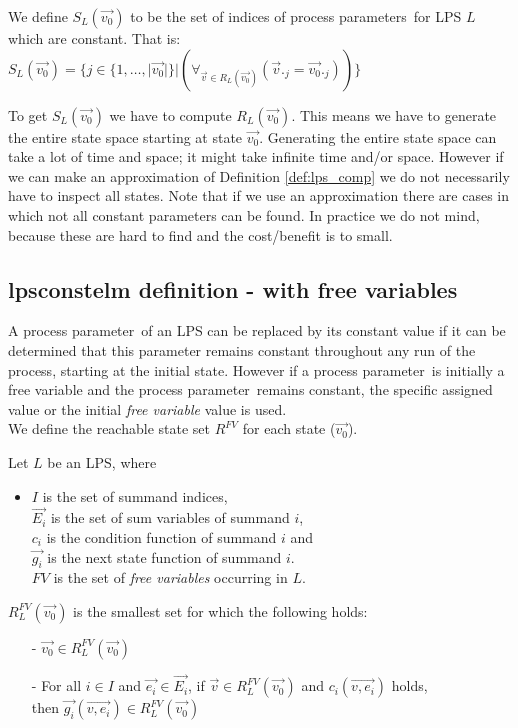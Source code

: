 \index{}\documentclass[a4paper,10pt]{article}
\theoremstyle{plain}
\theoremstyle{definition}
\newcommand{\ovr}{\overrightarrow}
\newcommand{\pp}{process parameter}
\newcommand{\pps}{process parameters}
\newcommand{\ti}{\textit}
\begin{document}
\begin{defn}\label{def:lps_comp} We define $S_L(\ovr{v_0})$ to be the set of indices of \pps\ for LPS $L$ which are constant. That is:\\

$S_L(\ovr{v_0}) = \lbrace j \in  \lbrace 1, \ldots, \vert \ovr{v_0}\vert  \rbrace \vert (\forall_{\ovr{v} \in R_L(\ovr{v_0})}( \ovr{v}._j = \ovr{v_{0}}._j)) \rbrace $
\end{defn}

To get $S_L(\ovr{v_0})$ we have to compute $R_L(\ovr{v_0})$. This means we have to generate the entire state space starting at state $\ovr{v_0}$. Generating the entire state space can take a lot of time and space; it might take infinite time and/or space. However if we can make an approximation of Definition \ref{def:lps_comp} we do not necessarily have to inspect all states. Note that if we use an approximation there are cases in which not all constant parameters can be found. In practice we do not mind, because these are hard to find and the cost/benefit is to small.

\subsection{lpsconstelm definition - with free variables}

A \pp\ of an LPS can be replaced by its constant value if it can be determined that this parameter remains constant throughout any run of the process, starting at the initial state. However if a \pp\ is initially a free variable and the \pp\ remains constant, the specific assigned value or the initial \ti{free variable} value is used.\\

We define the reachable state set $R^{FV}$ for each state ($\ovr{v_0}$). 
\begin{defn} Let $L$ be an LPS, where\begin{itemize}
\item $I$ is the set of summand indices, \\ $\ovr{E_i}$ is the set of sum variables of summand $i$, \\ $c_i$ is the condition function of summand $i$ and \\ $\ovr{g_i}$ is the next state function of summand $i$. \\
$FV$ is the set of \ti{free variables} occurring in $L$.\\
\end{itemize}

$R_L^{FV}(\ovr{v_0})$ is the smallest set for which the following holds:
  \begin{itemize}
    \item[-] $\ovr{v_0} \in R_L^{FV}(\ovr{v_0})$
    \item[-] For all $i \in I$ and $\ovr{e_i} \in \ovr{E_i}$, if $\ovr{v} \in R_L^{FV}(\ovr{v_0})$ and $c_i(\ovr{v, e_i})$ holds, \\ then $\ovr{g_i}(\ovr{v, e_i}) \in R_L^{FV}(\ovr{v_0})$ \\
   \end{itemize}
\end{defn}
\end{document}
